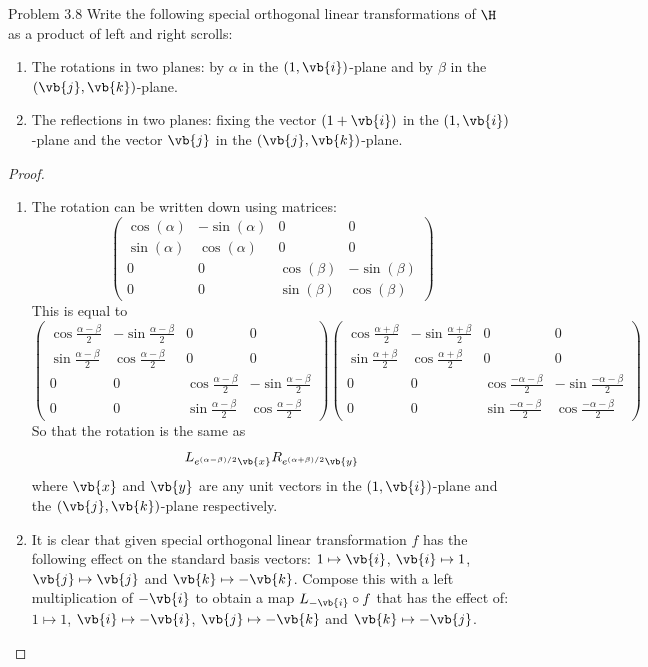 \documentclass[a4paper]{article}
\begin{document}
\begin{ex}{Problem 3.8}{} Write the following special orthogonal linear transformations of $\H$ as a product of left and right scrolls: 
\begin{enumerate}
\item The rotations in two planes: by $\alpha$ in the $(1,\vb{i})$-plane and by $\beta$ in the $(\vb{j},\vb{k})$-plane. 
\item The reflections in two planes: fixing the vector $(1+\vb{i})$ in the $(1,\vb{i})$-plane and the vector $\vb{j}$ in the $(\vb{j},\vb{k})$-plane. 
\end{enumerate} 
\begin{proof}~\\
\begin{enumerate}
\item The rotation can be written down using matrices: $$\begin{pmatrix}
\cos(\alpha) & -\sin(\alpha) & 0 & 0\\
\sin(\alpha) & \cos(\alpha) & 0 & 0\\
0 & 0 & \cos(\beta) & -\sin(\beta)\\
0 & 0 & \sin(\beta) & \cos(\beta)
\end{pmatrix}$$ This is equal to $$\begin{pmatrix}
\cos\frac{\alpha-\beta}{2} & -\sin\frac{\alpha-\beta}{2} & 0 & 0 \\
\sin\frac{\alpha-\beta}{2} & \cos\frac{\alpha-\beta}{2} & 0 & 0 \\
0 & 0 & \cos\frac{\alpha-\beta}{2} & -\sin\frac{\alpha-\beta}{2}\\
0 & 0 & \sin\frac{\alpha-\beta}{2} & \cos\frac{\alpha-\beta}{2}
\end{pmatrix}\begin{pmatrix}
\cos\frac{\alpha+\beta}{2} & -\sin\frac{\alpha+\beta}{2} & 0 & 0 \\
\sin\frac{\alpha+\beta}{2} & \cos\frac{\alpha+\beta}{2} & 0 & 0 \\
0 & 0 & \cos\frac{-\alpha-\beta}{2} & -\sin\frac{-\alpha-\beta}{2}\\
0 & 0 & \sin\frac{-\alpha-\beta}{2} & \cos\frac{-\alpha-\beta}{2}
\end{pmatrix}$$
So that the rotation is the same as $$L_{e^{(\alpha-\beta)/2}\vb{x}}R_{e^{(\alpha+\beta)/2}\vb{y}}$$ where $\vb{x}$ and $\vb{y}$ are any unit vectors in the $(1,\vb{i})$-plane and the $(\vb{j},\vb{k})$-plane respectively. 

\item It is clear that given special orthogonal linear transformation $f$ has the following effect on the standard basis vectors: $1\mapsto\vb{i}$, $\vb{i}\mapsto 1$, $\vb{j}\mapsto\vb{j}$ and $\vb{k}\mapsto-\vb{k}$. Compose this with a left multiplication of $-\vb{i}$ to obtain a map $L_{-\vb{i}}\circ f$ that has the effect of: $1\mapsto 1$, $\vb{i}\mapsto-\vb{i}$, $\vb{j}\mapsto-\vb{k}$ and $\vb{k}\mapsto-\vb{j}$. \\


\end{enumerate}
\end{proof}
\end{ex}
\end{document}
